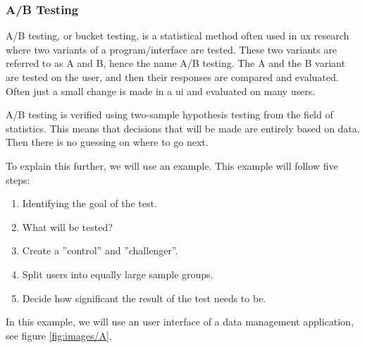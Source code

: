\subsubsection{A/B Testing}%
\label{sub:A/B Testing}
 

A/B testing, or bucket testing, is a statistical method often used in \acrfull{ux} research where two variants of a program/interface are tested. These two variants are referred to as A and B, hence the name A/B testing. The A and the B variant are tested on the user, and then their responses are compared and evaluated. Often just a small change is made in a \acrshort{ui} and evaluated on many users. 

A/B testing is verified using two-sample hypothesis testing from the field of statistics. This means that decisions that will be made are entirely based on data. Then there is no guessing on where to go next.

To explain this further, we will use an example.
This example will follow five steps: 
\begin{enumerate}
  \item Identifying the goal of the test. 
  \item What will be tested? 
 \item Create a ''control'' and ''challenger''. 
 \item Split users into equally large sample groups.
 \item Decide how significant the result of the test needs to be.
\end{enumerate}
 
In this example, we will use an user interface of a data management application, see figure \ref{fig:images/A}. 

